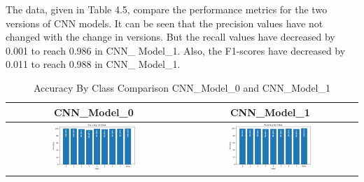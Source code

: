 \noindent The data, given in Table 4.5, compare the performance metrics for the two versions of CNN models. It can be seen that the precision values have not changed with the change in versions. But the recall values have decreased by 0.001 to reach 0.986 in CNN\_ Model\_1. Also, the F1-scores have decreased by 0.011 to reach 0.988 in CNN\_ Model\_1.

\vspace{1 cm}

\begin{table}[h!]
    \centering
    \caption{Accuracy By Class Comparison CNN\_Model\_0 and CNN\_Model\_1}
    \vspace{1.5mm}
    \begin{tabular}{|c|c|}
      \hline
      \textbf{CNN\_Model\_0} & \textbf{CNN\_Model\_1} \\
      \hline
      \includegraphics[width=0.5\textwidth]{Images/Perf_Eval/M0_acc_by_cls.png} & \includegraphics[width=0.5\textwidth]{Images/Perf_Eval/M1_acc_by_cls.png} \\
      \hline
    \end{tabular}
\end{table}

